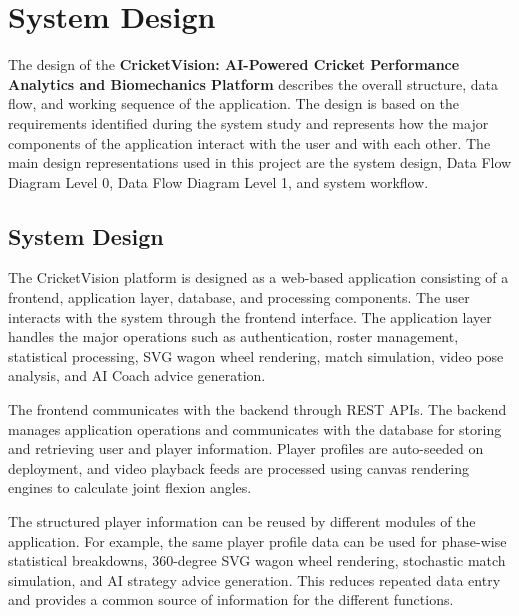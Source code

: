 \chapter{System Design}

The design of the \textbf{CricketVision: AI-Powered Cricket Performance Analytics and Biomechanics Platform} describes the overall structure, data flow, and working sequence of the application. The design is based on the requirements identified during the system study and represents how the major components of the application interact with the user and with each other. The main design representations used in this project are the system design, Data Flow Diagram Level 0, Data Flow Diagram Level 1, and system workflow.

\section{System Design}
The CricketVision platform is designed as a web-based application consisting of a frontend, application layer, database, and processing components. The user interacts with the system through the frontend interface. The application layer handles the major operations such as authentication, roster management, statistical processing, SVG wagon wheel rendering, match simulation, video pose analysis, and AI Coach advice generation.

The frontend communicates with the backend through REST APIs. The backend manages application operations and communicates with the database for storing and retrieving user and player information. Player profiles are auto-seeded on deployment, and video playback feeds are processed using canvas rendering engines to calculate joint flexion angles.

The structured player information can be reused by different modules of the application. For example, the same player profile data can be used for phase-wise statistical breakdowns, 360-degree SVG wagon wheel rendering, stochastic match simulation, and AI strategy advice generation. This reduces repeated data entry and provides a common source of information for the different functions.

